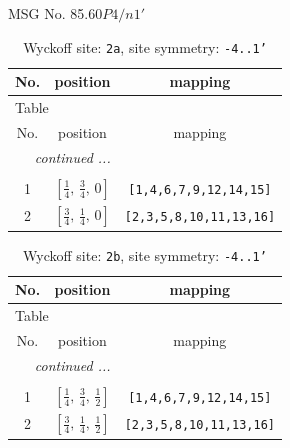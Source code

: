 \documentclass[fleqn,8pt]{jsarticle}
\begin{document}
\setcounter{MaxMatrixCols}{32}

\renewcommand{\tablename}{Table~}
\renewcommand{\figurename}{Figure~}
\begin{center}
\LARGE
MSG No. 85.60\quad$P4/n1'$
\end{center}
\renewcommand{\arraystretch}{1.2}
\begin{longtable}{ccc}
\caption{Wyckoff site: {\tt 2a}, site symmetry: {\tt -4..1'}}
 \\
 \hline \hline
No. & position & mapping \\ \hline \endfirsthead

\multicolumn{2}{l}{\tablename\ \thetable{}} \\
 \hline \hline
No. & position & mapping \\ \hline \endhead

 \hline \hline
\multicolumn{2}{r}{\footnotesize\it continued ...} \\ \endfoot

 \hline \hline
\multicolumn{2}{r}{} \\ \endlastfoot

1 & $\left[ \frac{1}{4},\, \frac{3}{4},\, 0 \right]$ & {\tt [1,4,6,7,9,12,14,15]} \\ \hline
2 & $\left[ \frac{3}{4},\, \frac{1}{4},\, 0 \right]$ & {\tt [2,3,5,8,10,11,13,16]} \\
\end{longtable}
\renewcommand{\arraystretch}{1.2}
\begin{longtable}{ccc}
\caption{Wyckoff site: {\tt 2b}, site symmetry: {\tt -4..1'}}
 \\
 \hline \hline
No. & position & mapping \\ \hline \endfirsthead

\multicolumn{2}{l}{\tablename\ \thetable{}} \\
 \hline \hline
No. & position & mapping \\ \hline \endhead

 \hline \hline
\multicolumn{2}{r}{\footnotesize\it continued ...} \\ \endfoot

 \hline \hline
\multicolumn{2}{r}{} \\ \endlastfoot

1 & $\left[ \frac{1}{4},\, \frac{3}{4},\, \frac{1}{2} \right]$ & {\tt [1,4,6,7,9,12,14,15]} \\ \hline
2 & $\left[ \frac{3}{4},\, \frac{1}{4},\, \frac{1}{2} \right]$ & {\tt [2,3,5,8,10,11,13,16]} \\
\end{longtable}
\end{document}
